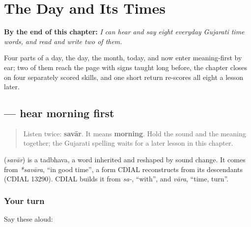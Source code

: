 
\chapter{The Day and Its Times}
\label{ch:gu-day-and-its-times}

\begin{chapteropening}
\textbf{By the end of this chapter:} \emph{I can hear and say eight everyday Gujarati time words, and read and write two of them.}

Four parts of a day, the day, the month, today, and now enter meaning-first by ear; two of them reach the page with signs taught long before, the chapter closes on four separately scored skills, and one short return re-scores all eight a lesson later.
\end{chapteropening}

\section[\texorpdfstring{\gu{સવાર} (savār)}{સવાર (savār)}]{ — hear morning first}

\label{lesson:GU-C24-hear-savaar}



\begin{quote}
Listen twice: \textbf{savār}. It means \textbf{morning}. Hold the sound and the meaning together; the Gujarati spelling waits for a later lesson in this chapter.
\end{quote}

\begin{cousinweb}
\textbf{} (\emph{savār}) is a tadbhava, a word inherited and reshaped by sound change. It comes from \emph{*savāra}, \textquotedblleft{}in good time\textquotedblright{}, a form CDIAL reconstructs from its descendants (CDIAL 13290). CDIAL builds it from \emph{sa-}, \textquotedblleft{}with\textquotedblright{}, and \emph{vāra}, \textquotedblleft{}time, turn\textquotedblright{}.
\end{cousinweb}

\subsection*{Your turn}
Say these aloud:

